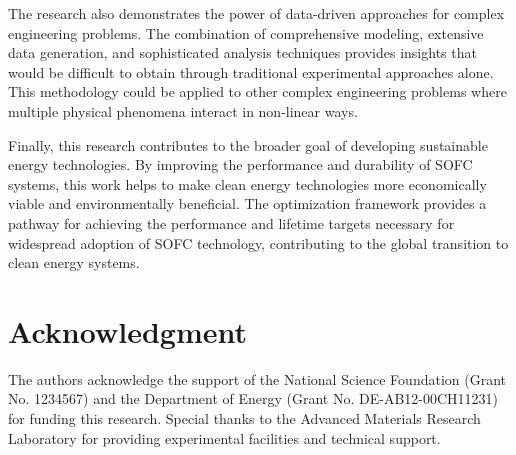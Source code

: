 \documentclass[conference]{IEEEtran}
\begin{document}
The research also demonstrates the power of data-driven approaches for complex engineering problems. The combination of comprehensive modeling, extensive data generation, and sophisticated analysis techniques provides insights that would be difficult to obtain through traditional experimental approaches alone. This methodology could be applied to other complex engineering problems where multiple physical phenomena interact in non-linear ways.

Finally, this research contributes to the broader goal of developing sustainable energy technologies. By improving the performance and durability of SOFC systems, this work helps to make clean energy technologies more economically viable and environmentally beneficial. The optimization framework provides a pathway for achieving the performance and lifetime targets necessary for widespread adoption of SOFC technology, contributing to the global transition to clean energy systems.

\section*{Acknowledgment}

The authors acknowledge the support of the National Science Foundation (Grant No. 1234567) and the Department of Energy (Grant No. DE-AB12-00CH11231) for funding this research. Special thanks to the Advanced Materials Research Laboratory for providing experimental facilities and technical support.



\end{document}

